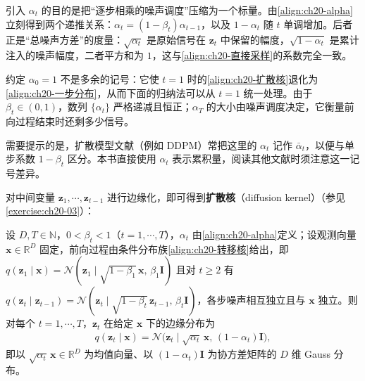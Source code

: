 \documentclass[../../main.tex]{subfiles}
\begin{document}
\begin{remark}
引入 $\alpha_t$ 的目的是把“逐步相乘的噪声调度”压缩为一个标量。由\eqref{align:ch20-alpha}立刻得到两个递推关系：$\alpha_t=(1-\beta_t)\alpha_{t-1}$，以及 $1-\alpha_t$ 随 $t$ 单调增加。后者正是“总噪声方差”的度量：$\sqrt{\alpha_t}$ 是原始信号在 $\bm{z}_t$ 中保留的幅度，$\sqrt{1-\alpha_t}$ 是累计注入的噪声幅度，二者平方和为 $1$，这与\eqref{align:ch20-直接采样}的系数完全一致。\par
约定 $\alpha_0=1$ 不是多余的记号：它使 $t=1$ 时的\eqref{align:ch20-扩散核}退化为\eqref{align:ch20-一步分布}，从而下面的归纳法可以从 $t=1$ 统一处理。由于 $\beta_t\in(0,1)$，数列 $\{\alpha_t\}$ 严格递减且恒正；$\alpha_T$ 的大小由噪声调度决定，它衡量前向过程结束时还剩多少信号。\par
需要提示的是，扩散模型文献（例如 DDPM）常把这里的 $\alpha_t$ 记作 $\bar{\alpha}_t$，以便与单步系数 $1-\beta_t$ 区分。本书直接使用 $\alpha_t$ 表示累积量，阅读其他文献时须注意这一记号差异。
\end{remark}

对中间变量 $\bm{z}_1,\cdots,\bm{z}_{t-1}$ 进行边缘化，即可得到\textbf{扩散核}（diffusion kernel）（参见\cref{exercise:ch20-03}）：

\begin{proposition}[扩散核的闭式边缘分布]\label{proposition:ch20-扩散核}
设 $D,T\in\mathbb{N}$，$0<\beta_{t}<1$（$t=1,\cdots,T$），$\alpha_t$ 由\eqref{align:ch20-alpha}定义；设观测向量 $\bm{x}\in\mathbb{R}^{D}$ 固定，前向过程由条件分布族\eqref{align:ch20-转移核}给出，即 $q(\bm{z}_1\mid\bm{x})=\mathcal{N}(\bm{z}_1\mid\sqrt{1-\beta_1}\,\bm{x},\,\beta_1\bm{I})$ 且对 $t\geqslant2$ 有 $q(\bm{z}_t\mid\bm{z}_{t-1})=\mathcal{N}(\bm{z}_t\mid\sqrt{1-\beta_t}\,\bm{z}_{t-1},\,\beta_t\bm{I})$，各步噪声相互独立且与 $\bm{x}$ 独立。则对每个 $t=1,\cdots,T$，$\bm{z}_t$ 在给定 $\bm{x}$ 下的边缘分布为
\begin{align}
q(\bm{z}_t\mid\bm{x})=\mathcal{N}\big(\bm{z}_t\mid\sqrt{\alpha_t}\,\bm{x},\,(1-\alpha_t)\bm{I}\big),
\label{align:ch20-扩散核}
\end{align}
即以 $\sqrt{\alpha_t}\,\bm{x}\in\mathbb{R}^{D}$ 为均值向量、以 $(1-\alpha_t)\bm{I}$ 为协方差矩阵的 $D$ 维 Gauss 分布。
\end{proposition}
\end{document}
